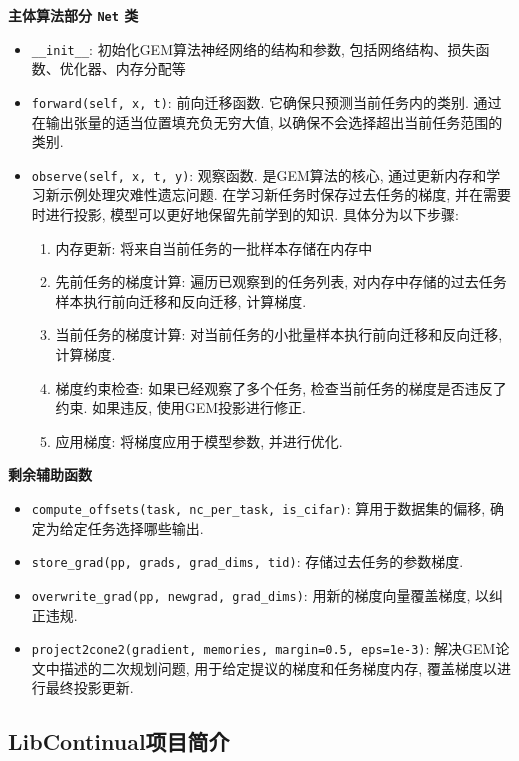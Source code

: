 \noindent\textbf{主体算法部分 \lstinline{Net} 类}
\begin{itemize}
    \item \lstinline{__init__}: 初始化GEM算法神经网络的结构和参数, 包括网络结构、损失函数、优化器、内存分配等
    \item \lstinline{forward(self, x, t)}: 前向迁移函数. 它确保只预测当前任务内的类别. 通过在输出张量的适当位置填充负无穷大值, 以确保不会选择超出当前任务范围的类别. 
    \item \lstinline{observe(self, x, t, y)}: 观察函数. 是GEM算法的核心, 通过更新内存和学习新示例处理灾难性遗忘问题. 在学习新任务时保存过去任务的梯度, 并在需要时进行投影, 模型可以更好地保留先前学到的知识. 
    具体分为以下步骤: 
    \begin{enumerate}
        \item 内存更新: 将来自当前任务的一批样本存储在内存中
        \item 先前任务的梯度计算: 遍历已观察到的任务列表, 对内存中存储的过去任务样本执行前向迁移和反向迁移, 计算梯度. 
        \item 当前任务的梯度计算: 对当前任务的小批量样本执行前向迁移和反向迁移, 计算梯度. 
        \item 梯度约束检查: 如果已经观察了多个任务, 检查当前任务的梯度是否违反了约束. 如果违反, 使用GEM投影进行修正. 
        \item 应用梯度: 将梯度应用于模型参数, 并进行优化. 
    \end{enumerate}
    
\end{itemize}

\noindent\textbf{剩余辅助函数}
\begin{itemize}
    \item \lstinline{compute_offsets(task, nc_per_task, is_cifar)}: 算用于数据集的偏移, 确定为给定任务选择哪些输出. 
    \item \lstinline{store_grad(pp, grads, grad_dims, tid)}: 存储过去任务的参数梯度. 
    \item \lstinline{overwrite_grad(pp, newgrad, grad_dims)}: 用新的梯度向量覆盖梯度, 以纠正违规. 
    \item \lstinline{project2cone2(gradient, memories, margin=0.5, eps=1e-3)}: 解决GEM论文中描述的二次规划问题, 用于给定提议的梯度和任务梯度内存, 覆盖梯度以进行最终投影更新. 
\end{itemize}
        

\subsection{LibContinual项目简介}
